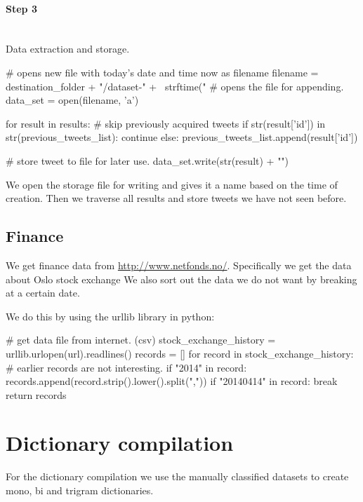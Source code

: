 \paragraph{Step 3}
\hspace{0pt}\\
Data extraction and storage.
\begin{python}
# opens new file with today's date and time now as filename
filename = destination_folder + "/dataset-" + \
    strftime("%
# opens the file for appending.
data_set = open(filename, 'a')

for result in results:
    # skip previously acquired tweets
    if str(result['id']) in str(previous_tweets_list):
        continue
    else:
        previous_tweets_list.append(result['id'])
    
    # store tweet to file for later use.
    data_set.write(str(result) + "\n")
\end{python}

We open the storage file for writing and gives it a name based on the time of
creation. Then we traverse all results and store tweets we have not seen
before. 

\subsection{Finance}
We get finance data from \url{http://www.netfonds.no/}. Specifically we get the
data about Oslo stock exchange
We also sort out the data we do not want by breaking at a certain date. 

We do this by using the urllib library in python: 
\begin{python}
# get data file from internet. (csv)
stock_exchange_history = urllib.urlopen(url).readlines()
records = []
for record in stock_exchange_history:
    # earlier records are not interesting.
    if "2014" in record:
        records.append(record.strip().lower().split(","))
    if "20140414" in record:
        break
return records
\end{python}
%

\section{Dictionary compilation}\label{code:dictionary_compilation}
For the dictionary compilation we use the manually classified datasets to
create mono, bi and trigram dictionaries. 

